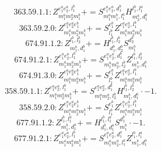 \documentclass[letterpaper,10pt,fleqn,leqno,onecolumn]{article}
\begin{document}
\begin{equation} \;\;\;\;\;\;  363.59.1.1: Z^{e_{1}^{a}e_{2}^{a},l_{1}^{b}}_{m_{1}^{a}m_{2}^{a}m_{1}^{b}}+=S^{e_{1}^{a}e_{2}^{a},d_{1}^{b}}_{m_{1}^{a}m_{1}^{b},l_{1}^{a}}H^{l_{1}^{b},l_{1}^{a}}_{m_{2}^{a},d_{1}^{b}} \end{equation}
\begin{equation} \;\;\;\;\;\;  363.59.2.0: Z^{e_{1}^{a}e_{2}^{a}e_{1}^{b}}_{m_{1}^{a}m_{2}^{a}m_{1}^{b}}+=S^{e_{1}^{b}}_{l_{1}^{b}}Z^{e_{1}^{a}e_{2}^{a},l_{1}^{b}}_{m_{1}^{a}m_{2}^{a}m_{1}^{b}} \end{equation}
\begin{equation} \;\;\;\;\;\;  674.91.1.2: Z^{l_{1}^{b},l_{2}^{b}}_{m_{1}^{b},d_{1}^{b}}+=H^{l_{1}^{b},l_{2}^{b}}_{d_{1}^{b},d_{2}^{b}}S^{d_{2}^{b}}_{m_{1}^{b}} \end{equation}
\begin{equation} \;\;\;\;\;\;  674.91.2.1: Z^{e_{1}^{a}e_{2}^{a},l_{1}^{b}}_{m_{1}^{a}m_{2}^{a}m_{1}^{b}}+=S^{e_{1}^{a}e_{2}^{a},d_{1}^{b}}_{m_{1}^{a}m_{2}^{a},l_{2}^{b}}Z^{l_{1}^{b},l_{2}^{b}}_{m_{1}^{b},d_{1}^{b}} \end{equation}
\begin{equation} \;\;\;\;\;\;  674.91.3.0: Z^{e_{1}^{a}e_{2}^{a}e_{1}^{b}}_{m_{1}^{a}m_{2}^{a}m_{1}^{b}}+=S^{e_{1}^{b}}_{l_{1}^{b}}Z^{e_{1}^{a}e_{2}^{a},l_{1}^{b}}_{m_{1}^{a}m_{2}^{a}m_{1}^{b}} \end{equation}
\begin{equation} \;\;\;\;\;\;  358.59.1.1: Z^{e_{1}^{a}e_{2}^{a},l_{1}^{b}}_{m_{1}^{a}m_{2}^{a}m_{1}^{b}}+=S^{e_{1}^{a}e_{2}^{a},d_{1}^{b}}_{m_{1}^{a}m_{2}^{a},l_{2}^{b}}H^{l_{1}^{b},l_{2}^{b}}_{m_{1}^{b},d_{1}^{b}}\cdot -1. \end{equation}
\begin{equation} \;\;\;\;\;\;  358.59.2.0: Z^{e_{1}^{a}e_{2}^{a}e_{1}^{b}}_{m_{1}^{a}m_{2}^{a}m_{1}^{b}}+=S^{e_{1}^{b}}_{l_{1}^{b}}Z^{e_{1}^{a}e_{2}^{a},l_{1}^{b}}_{m_{1}^{a}m_{2}^{a}m_{1}^{b}} \end{equation}
\begin{equation} \;\;\;\;\;\;  677.91.1.2: Z^{l_{1}^{b},l_{1}^{a}}_{m_{1}^{b},d_{1}^{a}}+=H^{l_{1}^{b},l_{1}^{a}}_{d_{1}^{b},d_{1}^{a}}S^{d_{1}^{b}}_{m_{1}^{b}}\cdot -1. \end{equation}
\begin{equation} \;\;\;\;\;\;  677.91.2.1: Z^{e_{1}^{a}e_{2}^{a},l_{1}^{b}}_{m_{1}^{a}m_{2}^{a}m_{1}^{b}}+=S^{e_{1}^{a}e_{2}^{a},d_{1}^{a}}_{m_{1}^{a}m_{2}^{a},l_{1}^{a}}Z^{l_{1}^{b},l_{1}^{a}}_{m_{1}^{b},d_{1}^{a}} \end{equation}
\end{document}
